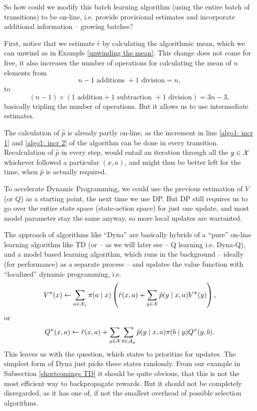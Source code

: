 So how could we modify this batch learning algorithm (using the entire batch of transitions) to be on-line, i.e. provide provisional estimates and incorporate additional information -- growing batches?

First, notice that we estimate \(\hat{r}\) by calculating the algorithmic mean, which we can unwind as in Example \ref{unwinding the mean}. This change does not come for free, it also increases the number of operations for calculating the mean of \(n\) elements from 
\[
	n-1 \text{ additions } + 1\text{ division} = n,
\]
to 
\[
	(n-1) \times (1\text{ addition} + 1 \text{ subtraction } + 1\text{ division})=3n - 3,
\]
basically tripling the number of operations. But it allows us to use intermediate estimates.

The calculation of \(\hat{p}\) is already partly on-line, as the increment in line \ref{algo1: incr 1} and \ref{algo1: incr 2} of the algorithm can be done in every transition. Recalculation of \(\hat{p}\) in every step, would entail an iteration through all the \(y\in\mathcal{X}\) whichever followed a particular \((x,a)\), and might thus be better left for the time, when \(\hat{p}\) is actually required.

To accelerate Dynamic Programming, we could use the previous estimation of \(V\) (or \(Q\)) as a starting point, the next time we use DP. But DP still requires us to go over the entire state space (state-action space) for just one update, and most model parameter stay the same anyway, so more local updates are warranted.

The approach of algorithms like ``Dyna'' are basically hybrids of a ``pure'' on-line learning algorithm like TD (or -- as we will later see -- Q learning i.e. Dyna-Q), and a model based learning algorithm, which runs in the background -- ideally (for performance) as a separate process -- and updates the value function with ``localized'' dynamic programming, i.e.
\begin{align}
	\label{async DP V}
	V^\pi(x) \gets \sum_{a\in\mathcal{X}_x}\pi(a\mid x) \left( \hat{r}(x,a) + \sum_{y\in\mathcal{X}} \hat{p}(y\mid x,a) V^\pi(y)\right),
\end{align}
or
\begin{align}\label{async DP Q}
	Q^\pi(x,a) \gets \hat{r}(x,a) + \sum_{y\in\mathcal{X}}\sum_{b\in\mathcal{A}_y} \hat{p}(y\mid x,a) \pi(b\mid y) Q^\pi(y,b).
\end{align}
This leaves us with the question, which states to prioritize for updates. The simplest form of Dyna just picks these states randomly. From our example in Subsection \ref{shortcomings TD} it should be quite obvious, that this is not the most efficient way to backpropagate rewards. But it should not be completely disregarded, as it has one of, if not the smallest overhead of possible selection algorithms. 

